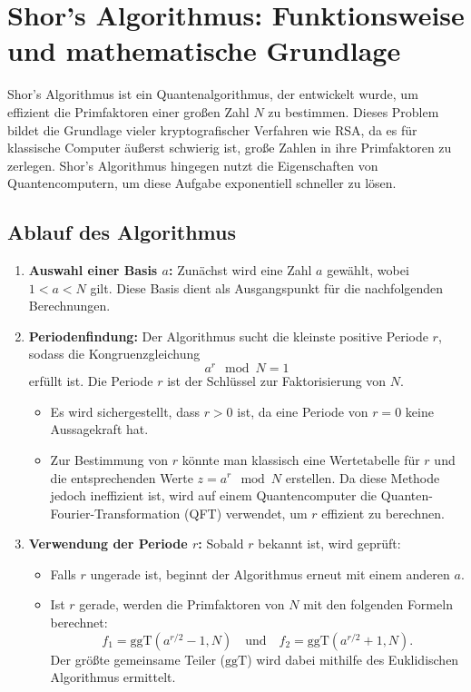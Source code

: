 \section{Shor’s Algorithmus: Funktionsweise und mathematische Grundlage}

Shor’s Algorithmus ist ein Quantenalgorithmus, der entwickelt wurde, um 
effizient die Primfaktoren einer großen Zahl $N$ zu bestimmen. Dieses 
Problem bildet die Grundlage vieler kryptografischer Verfahren wie RSA, 
da es für klassische Computer äußerst schwierig ist, große Zahlen in 
ihre Primfaktoren zu zerlegen. Shor’s Algorithmus hingegen nutzt die 
Eigenschaften von Quantencomputern, um diese Aufgabe exponentiell 
schneller zu lösen. \cite{shor}

\subsection{Ablauf des Algorithmus}

\begin{enumerate}
    \item \textbf{Auswahl einer Basis $a$:}  
    Zunächst wird eine Zahl $a$ gewählt, wobei $1 < a < N$ gilt. Diese 
    Basis dient als Ausgangspunkt für die nachfolgenden Berechnungen.

    \item \textbf{Periodenfindung:}  
    Der Algorithmus sucht die kleinste positive Periode $r$, sodass die 
    Kongruenzgleichung  
    \[
    a^r \mod N = 1
    \]  
    erfüllt ist. Die Periode $r$ ist der Schlüssel zur Faktorisierung von $N$.  
    \begin{itemize}
        \item Es wird sichergestellt, dass $r > 0$ ist, da eine Periode von 
        $r = 0$ keine Aussagekraft hat.
        \item Zur Bestimmung von $r$ könnte man klassisch eine Wertetabelle 
        für $r$ und die entsprechenden Werte $z = a^r \mod N$ erstellen. Da 
        diese Methode jedoch ineffizient ist, wird auf einem Quantencomputer 
        die Quanten-Fourier-Transformation (QFT) verwendet, um $r$ effizient 
        zu berechnen.
    \end{itemize}

    \item \textbf{Verwendung der Periode $r$:}  
    Sobald $r$ bekannt ist, wird geprüft:  
    \begin{itemize}
        \item Falls $r$ ungerade ist, beginnt der Algorithmus erneut mit 
        einem anderen $a$.
        \item Ist $r$ gerade, werden die Primfaktoren von $N$ mit den 
        folgenden Formeln berechnet:  
        \[
        f_1 = \text{ggT}\left(a^{r/2} - 1, N\right) \quad \text{und} \quad f_2 = \text{ggT}\left(a^{r/2} + 1, N\right).
        \]  
        Der größte gemeinsame Teiler ($\text{ggT}$) wird dabei mithilfe 
        des Euklidischen Algorithmus ermittelt. \cite{shor_klassisch} \cite{shor_klassisch2} 
    \end{itemize}
\end{enumerate}

